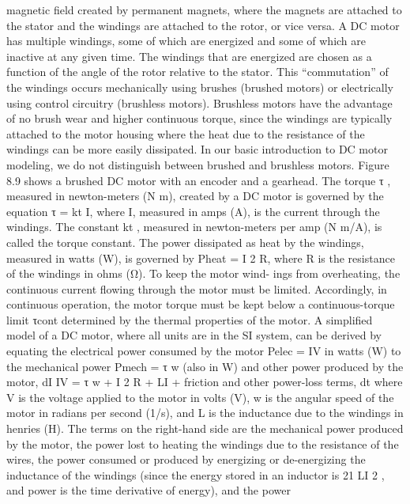 \documentclass[12pt,a4paper]{article}
\begin{document}
magnetic field created by permanent magnets, where the magnets are attached
to the stator and the windings are attached to the rotor, or vice versa. A DC
motor has multiple windings, some of which are energized and some of which
are inactive at any given time. The windings that are energized are chosen as a
function of the angle of the rotor relative to the stator. This “commutation” of
the windings occurs mechanically using brushes (brushed motors) or electrically
using control circuitry (brushless motors). Brushless motors have the advantage
of no brush wear and higher continuous torque, since the windings are typically
attached to the motor housing where the heat due to the resistance of the
windings can be more easily dissipated. In our basic introduction to DC motor
modeling, we do not distinguish between brushed and brushless motors.
    Figure 8.9 shows a brushed DC motor with an encoder and a gearhead.
    The torque τ , measured in newton-meters (N m), created by a DC motor is
governed by the equation
                                     τ = kt I,
where I, measured in amps (A), is the current through the windings. The
constant kt , measured in newton-meters per amp (N m/A), is called the torque
constant. The power dissipated as heat by the windings, measured in watts
(W), is governed by
                                 Pheat = I 2 R,
where R is the resistance of the windings in ohms (Ω). To keep the motor wind-
ings from overheating, the continuous current flowing through the motor must
be limited. Accordingly, in continuous operation, the motor torque must be kept
below a continuous-torque limit τcont determined by the thermal properties of
the motor.
    A simplified model of a DC motor, where all units are in the SI system, can
be derived by equating the electrical power consumed by the motor Pelec = IV
in watts (W) to the mechanical power Pmech = τ w (also in W) and other power
produced by the motor,
                                       dI
          IV = τ w + I 2 R + LI           + friction and other power-loss terms,
                                       dt
where V is the voltage applied to the motor in volts (V), w is the angular speed
of the motor in radians per second (1/s), and L is the inductance due to the
windings in henries (H). The terms on the right-hand side are the mechanical
power produced by the motor, the power lost to heating the windings due to
the resistance of the wires, the power consumed or produced by energizing or
de-energizing the inductance of the windings (since the energy stored in an
inductor is 21 LI 2 , and power is the time derivative of energy), and the power
\end{document}
